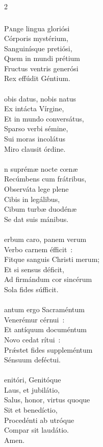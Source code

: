 \documentclass[9pt,twoside]{extarticle}
\begin{document}
\begin{multicols}{2}
\subsubsection*{\center{}}
\lettrine{P}ange lingua gloriósi\\ 
Córporis mystérium,\\ 
Sanguinísque pretiósi,\\ 
Quem in mundi prétium\\ 
Fructus ventris generósi\\ 
Rex effúdit Géntium.\\
\\
obis datus, nobis natus\\ 
Ex intácta Vírgine,\\ 
Et in mundo conversátus,\\ 
Sparso verbi sémine,\\ 
Sui moras incolátus\\ 
Miro clausit órdine.\\ 
\\
n suprémæ nocte cœnæ\\ 
Recúmbens cum frátribus,\\ 
Observáta lege plene\\ 
Cibis in legálibus,\\ 
Cibum turbæ duodénæ\\ 
Se dat suis mánibus.\\
\\
erbum caro, panem verum\\ 
Verbo carnem éfficit~:\\ 
Fitque sanguis Christi merum;\\ 
Et si sensus déficit,\\ 
Ad firmándum cor sincérum\\ 
Sola fides súfficit.\\
\\
antum ergo Sacraméntum\\ 
Venerémur cérnui~:\\ 
Et antíquum documéntum\\ 
Novo cedat rítui~:\\ 
Prǽstet fides suppleméntum\\ 
Sénsuum deféctui.\\
\\
enitóri, Genitóque\\ 
Laus, et jubilátio,\\ 
Salus, honor, virtus quoque\\ 
Sit et benedíctio,\\ 
Procedénti ab utróque\\ 
Compar sit laudátio.\\
Amen.


\end{multicols}
\end{document}
